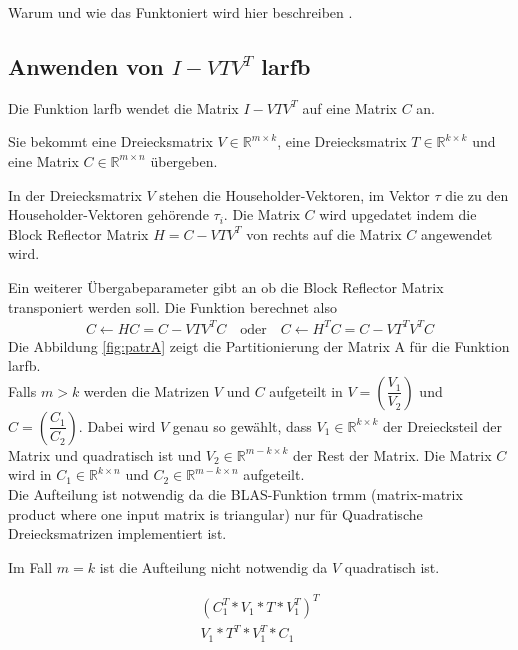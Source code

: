 Warum und wie das Funktoniert wird hier beschreiben \cite{Joffrain:2006:AHT:1141885.1141886}.




\subsection{Anwenden von $I - VTV^T$ larfb}

Die Funktion \glqq larfb \grqq{} wendet die Matrix $I - VTV^T$ auf eine Matrix $C$ an.

Sie bekommt eine Dreiecksmatrix $V \in \mathbb{R}^{m \times k}$, eine Dreiecksmatrix $T \in \mathbb{R}^{k \times k}$ und eine Matrix $C \in \mathbb{R}^{m \times n }$ übergeben.

In der Dreiecksmatrix $V$ stehen die Householder-Vektoren,
im Vektor $\tau$ die zu den Householder-Vektoren gehörende $\tau_i$.
Die Matrix $C$ wird upgedatet indem die  Block Reflector Matrix $ 	H = C - V T V^T $ von rechts auf die Matrix $ C $ angewendet wird. 

Ein weiterer Übergabeparameter gibt an ob die Block Reflector Matrix transponiert werden soll.
Die Funktion berechnet also
\begin{align*}
	C \leftarrow H C = C - V T V^T C \quad \text{oder} \quad 	C \leftarrow H^T C = C - V T^T V^T C
\end{align*}
Die Abbildung \ref{fig:patrA} zeigt die Partitionierung der Matrix A für die Funktion larfb.\\
Falls $m > k $ werden die Matrizen $V$ und $C$ aufgeteilt in $V=\left(\dfrac{V_1}{V_2}\right)$ und $C=\left(\dfrac{C_1}{C_2}\right)$. Dabei wird $V$ genau so gewählt, dass $V_1 \in \mathbb{R}^{k\times k}$ der Dreiecksteil der Matrix und quadratisch ist und $V_2 \in \mathbb{R}^{m-k\times k}$ der Rest der Matrix. Die Matrix $C$ wird in $C_1 \in \mathbb{R}^{k \times n}$ und $C_2 \in \mathbb{R}^{m-k \times n}$  aufgeteilt.\\
Die Aufteilung ist notwendig da die BLAS-Funktion trmm (matrix-matrix product where one input matrix is triangular) nur für Quadratische Dreiecksmatrizen implementiert ist.

Im Fall $ m = k $ ist die Aufteilung nicht notwendig da $ V $ quadratisch ist.

\begin{align*}
	(C_1^T * V_1 * T *V_1^T)^T\\
	V_1 * T^T * V_1^T * C_1
\end{align*}



